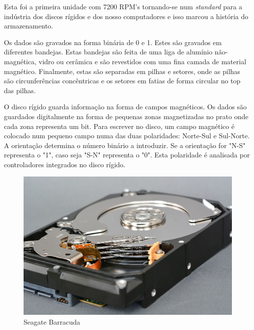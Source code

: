 \documentclass{report}
\begin{document}
	Esta foi a primeira unidade com 7200 RPM's tornando-se num \textit{standard} para a indústria dos discos rígidos e dos nosso computadores e isso marcou a história do armazenamento.
\vspace{1mm}
	
	Os dados são gravados na forma binária de 0 e 1. Estes são gravados em diferentes bandejas. Estas bandejas são feita de uma liga de alumínio não-magnética, vidro ou cerâmica e são revestidos com uma fina camada de material magnético. Finalmente, estas são separadas em pilhas e setores, onde as pilhas são circunferências concêntricas e os setores em fatias de forma circular no top das pilhas.
\vspace{1mm}
	
	O disco rígido guarda informação na forma de campos magnéticos. Os dados são guardados digitalmente na forma de pequenas zonas magnetizadas no prato onde cada zona representa um bit. Para escrever no disco, um campo magnético é colocado num pequeno campo numa das duas polaridades: Norte-Sul e Sul-Norte. A orientação determina o número binário a introduzir. Se a orientação for "N-S" representa o "1", caso seja "S-N" representa o "0". Esta polaridade é analisada por controladores integrados no disco rígido.
\vspace{1mm}

	\begin{figure} [h]
		\centering
		\includegraphics[scale=0.7]{barracuda.jpg}
		\caption{Seagate Barracuda}
	\end{figure}
	

\end{document}

